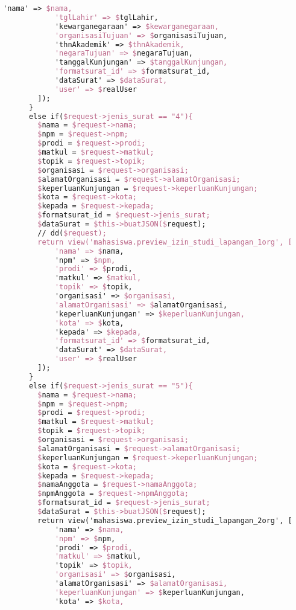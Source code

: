 \begin{lstlisting}[language=tex,basicstyle=\tiny,caption=PesanansuratController.php]
            'nama' => $nama,
            'tglLahir' => $tglLahir,
            'kewarganegaraan' => $kewarganegaraan,
            'organisasiTujuan' => $organisasiTujuan,
            'thnAkademik' => $thnAkademik,
            'negaraTujuan' => $negaraTujuan,
            'tanggalKunjungan' => $tanggalKunjungan,
            'formatsurat_id' => $formatsurat_id,
            'dataSurat' => $dataSurat,
            'user' => $realUser
        ]);
      }
      else if($request->jenis_surat == "4"){
        $nama = $request->nama;
        $npm = $request->npm;
        $prodi = $request->prodi;
        $matkul = $request->matkul;
        $topik = $request->topik;
        $organisasi = $request->organisasi;
        $alamatOrganisasi = $request->alamatOrganisasi;
        $keperluanKunjungan = $request->keperluanKunjungan;
        $kota = $request->kota;
        $kepada = $request->kepada;
        $formatsurat_id = $request->jenis_surat;
        $dataSurat = $this->buatJSON($request);
        // dd($request);
        return view('mahasiswa.preview_izin_studi_lapangan_1org', [
            'nama' => $nama,
            'npm' => $npm,
            'prodi' => $prodi,
            'matkul' => $matkul,
            'topik' => $topik,
            'organisasi' => $organisasi,
            'alamatOrganisasi' => $alamatOrganisasi,
            'keperluanKunjungan' => $keperluanKunjungan,
            'kota' => $kota,
            'kepada' => $kepada,
            'formatsurat_id' => $formatsurat_id,
            'dataSurat' => $dataSurat,
            'user' => $realUser
        ]);
      }
      else if($request->jenis_surat == "5"){
        $nama = $request->nama;
        $npm = $request->npm;
        $prodi = $request->prodi;
        $matkul = $request->matkul;
        $topik = $request->topik;
        $organisasi = $request->organisasi;
        $alamatOrganisasi = $request->alamatOrganisasi;
        $keperluanKunjungan = $request->keperluanKunjungan;
        $kota = $request->kota;
        $kepada = $request->kepada;
        $namaAnggota = $request->namaAnggota;
        $npmAnggota = $request->npmAnggota;
        $formatsurat_id = $request->jenis_surat;
        $dataSurat = $this->buatJSON($request);
        return view('mahasiswa.preview_izin_studi_lapangan_2org', [
            'nama' => $nama,
            'npm' => $npm,
            'prodi' => $prodi,
            'matkul' => $matkul,
            'topik' => $topik,
            'organisasi' => $organisasi,
            'alamatOrganisasi' => $alamatOrganisasi,
            'keperluanKunjungan' => $keperluanKunjungan,
            'kota' => $kota,

\end{lstlisting}
